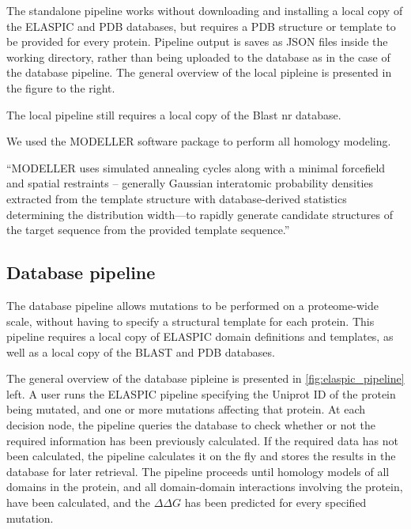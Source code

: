 The standalone pipeline works without downloading and installing a local copy of the ELASPIC and PDB databases, but requires a PDB structure or template to be provided for every protein. Pipeline output is saves as JSON files inside the working directory, rather than being uploaded to the database as in the case of the database pipeline. The general overview of the local pipleine is presented in the figure to the right.

The local pipeline still requires a local copy of the Blast nr database.

We used the MODELLER software package to perform all homology modeling.

``MODELLER uses simulated annealing cycles along with a minimal forcefield and spatial restraints -- generally Gaussian interatomic probability densities extracted from the template structure with database-derived statistics determining the distribution width—to rapidly generate candidate structures of the target sequence from the provided template sequence.''


\subsection{Database pipeline}

The database pipeline allows mutations to be performed on a proteome-wide scale, without having to specify a structural template for each protein. This pipeline requires a local copy of ELASPIC domain definitions and templates, as well as a local copy of the BLAST and PDB databases.

The general overview of the database pipleine is presented in \ref{fig:elaspic_pipeline} left. A user runs the ELASPIC pipeline specifying the Uniprot ID of the protein being mutated, and one or more mutations affecting that protein. At each decision node, the pipeline queries the database to check whether or not the required information has been previously calculated. If the required data has not been calculated, the pipeline calculates it on the fly and stores the results in the database for later retrieval. The pipeline proceeds until homology models of all domains in the protein, and all domain-domain interactions involving the protein, have been calculated, and the $\Delta \Delta G$ has been predicted for every specified mutation.

